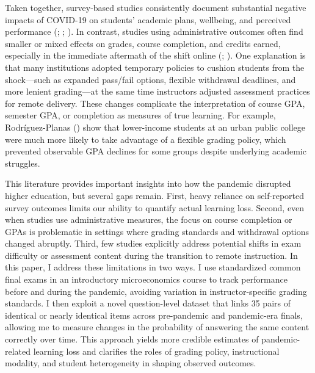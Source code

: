 \documentclass[
  12pt,
  letterpaper,
  DIV=11,
  numbers=noendperiod]{scrartcl}
\begin{document}
Taken together, survey-based studies consistently document substantial
negative impacts of COVID-19 on students' academic plans, wellbeing, and
perceived performance (; ; ). In
contrast, studies using administrative outcomes often find smaller or
mixed effects on grades, course completion, and credits earned,
especially in the immediate aftermath of the shift online
(;
). One explanation is that many institutions adopted temporary
policies to cushion students from the shock---such as expanded pass/fail
options, flexible withdrawal deadlines, and more lenient grading---at
the same time instructors adjusted assessment practices for remote
delivery. These changes complicate the interpretation of course GPA,
semester GPA, or completion as measures of true learning. For example,
Rodríguez-Planas ()
show that lower-income students at an urban public college were much
more likely to take advantage of a flexible grading policy, which
prevented observable GPA declines for some groups despite underlying
academic struggles.

This literature provides important insights into how the pandemic
disrupted higher education, but several gaps remain. First, heavy
reliance on self-reported survey outcomes limits our ability to quantify
actual learning loss. Second, even when studies use administrative
measures, the focus on course completion or GPAs is problematic in
settings where grading standards and withdrawal options changed
abruptly. Third, few studies explicitly address potential shifts in exam
difficulty or assessment content during the transition to remote
instruction. In this paper, I address these limitations in two ways. I
use standardized common final exams in an introductory microeconomics
course to track performance before and during the pandemic, avoiding
variation in instructor-specific grading standards. I then exploit a
novel question-level dataset that links 35 pairs of identical or nearly
identical items across pre-pandemic and pandemic-era finals, allowing me
to measure changes in the probability of answering the same content
correctly over time. This approach yields more credible estimates of
pandemic-related learning loss and clarifies the roles of grading
policy, instructional modality, and student heterogeneity in shaping
observed outcomes.
\end{document}
